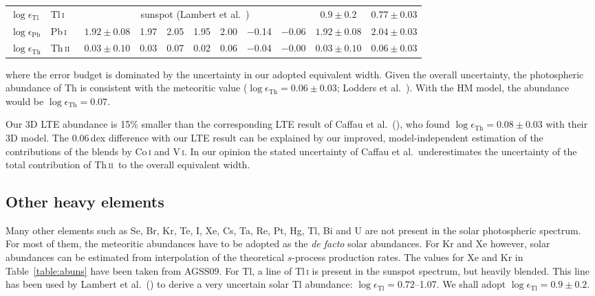 \documentclass[traditabstract]{aa}
\newcommand{\altpbi}{Pb\,\textsc{i}}
\newcommand{\altthii}{Th\,\textsc{ii}}
\newcommand{\alttli}{Tl\,\textsc{i}}
\newcommand{\pbi}{\altpbi\ }
\newcommand{\thii}{\altthii\ }
\newcommand{\tli}{\alttli\ }
\begin{document}
\begin{table}[p]
\begin{tabular}{l l c c c c c c c c c}
$\log \epsilon_\mathrm{Tl}$     & \tli    & \multicolumn{7}{c}{sunspot (Lambert et al.\ \cite{lamb2})}    &  $0.9\pm0.2$  & $0.77\pm0.03$\vspace{1mm}\\
$\log \epsilon_\mathrm{Pb}$     & \pbi    & $1.92\pm0.08$ & 1.97 & 2.05 & 1.95 & 2.00 & $-$0.14 & $-$0.06 & $1.92\pm0.08$ & $2.04\pm0.03$\vspace{1mm}\\
$\log \epsilon_\mathrm{Th}$     & \thii   & $0.03\pm0.10$ & 0.03 & 0.07 & 0.02 & 0.06 & $-$0.04 & $-$0.00 & $0.03\pm0.10$ & $0.06\pm0.03$\vspace{0.5mm}\\
\hline							  
\end{tabular}						  
\end{table}
\afterpage{\clearpage}

\noindent where the error budget is dominated by the uncertainty in our adopted equivalent width.  Given the overall uncertainty, the photospheric abundance of Th is consistent with the meteoritic value ($\log \epsilon_{\mathrm{Th}}=0.06\pm0.03$; Lodders et al.\ \cite{lodd}).  With the HM model, the abundance would be $\log\epsilon_{\mathrm{Th}}=0.07$. 

Our 3D LTE abundance is 15$\%$ smaller than the corresponding LTE result of Caffau et al.\ (\cite{caf2}), who found $\log \epsilon_{\mathrm{Th}}=0.08\pm0.03$ with their 3D model. The 0.06\,dex difference with our LTE result can be explained by our improved, model-independent estimation of the contributions of the blends by Co\,\textsc{i} and V\,\textsc{i}.  In our opinion the stated uncertainty of Caffau et al.\  underestimates the uncertainty of the total contribution of \thii to the overall equivalent width.

\subsection{Other heavy elements}
Many other elements such as Se, Br, Kr, Te, I, Xe, Cs, Ta, Re, Pt, Hg, Tl, Bi and U are not present in the solar photospheric spectrum.  For most of them, the meteoritic abundances have to be adopted as the \textit{de facto} solar abundances. For Kr and Xe however, solar abundances can be estimated from interpolation of the theoretical $s$-process production rates.  The values for Xe and Kr in Table~\ref{table:abuns} have been taken from AGSS09. For Tl, a line of Tl\,\textsc{i} is present in the sunspot spectrum, but heavily blended.  This line has been used by Lambert et al.\ (\cite{lamb2}) to derive a very uncertain solar Tl abundance: $\log\epsilon_{\mathrm{Tl}}=0.72$--1.07.  We shall adopt $\log\epsilon_{\mathrm{Tl}}=0.9\pm0.2$.
\end{document}

